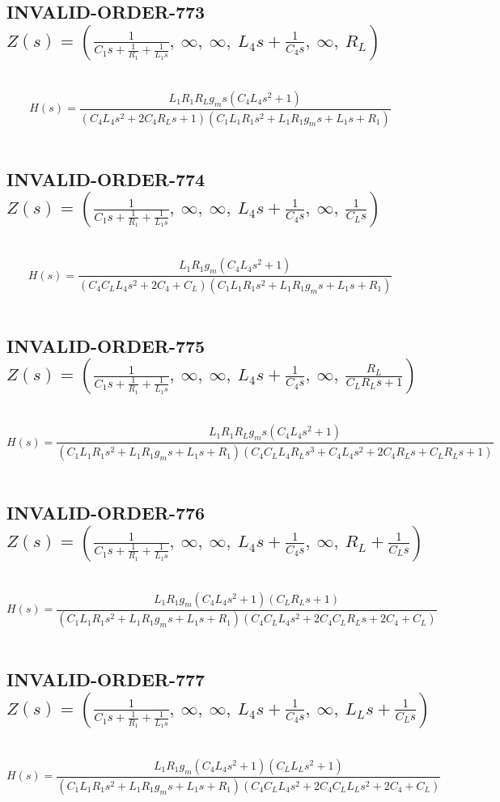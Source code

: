 \documentclass{article}
\begin{document}
\subsection{INVALID-ORDER-773 $Z(s) = \left( \frac{1}{C_{1} s + \frac{1}{R_{1}} + \frac{1}{L_{1} s}}, \  \infty, \  \infty, \  L_{4} s + \frac{1}{C_{4} s}, \  \infty, \  R_{L}\right)$ } \ 
\textbf{\[H(s) = \frac{L_{1} R_{1} R_{L} g_{m} s \left(C_{4} L_{4} s^{2} + 1\right)}{\left(C_{4} L_{4} s^{2} + 2 C_{4} R_{L} s + 1\right) \left(C_{1} L_{1} R_{1} s^{2} + L_{1} R_{1} g_{m} s + L_{1} s + R_{1}\right)}\] } \ 
\subsection{INVALID-ORDER-774 $Z(s) = \left( \frac{1}{C_{1} s + \frac{1}{R_{1}} + \frac{1}{L_{1} s}}, \  \infty, \  \infty, \  L_{4} s + \frac{1}{C_{4} s}, \  \infty, \  \frac{1}{C_{L} s}\right)$ } \ 
\textbf{\[H(s) = \frac{L_{1} R_{1} g_{m} \left(C_{4} L_{4} s^{2} + 1\right)}{\left(C_{4} C_{L} L_{4} s^{2} + 2 C_{4} + C_{L}\right) \left(C_{1} L_{1} R_{1} s^{2} + L_{1} R_{1} g_{m} s + L_{1} s + R_{1}\right)}\] } \ 
\subsection{INVALID-ORDER-775 $Z(s) = \left( \frac{1}{C_{1} s + \frac{1}{R_{1}} + \frac{1}{L_{1} s}}, \  \infty, \  \infty, \  L_{4} s + \frac{1}{C_{4} s}, \  \infty, \  \frac{R_{L}}{C_{L} R_{L} s + 1}\right)$ } \ 
\textbf{\[H(s) = \frac{L_{1} R_{1} R_{L} g_{m} s \left(C_{4} L_{4} s^{2} + 1\right)}{\left(C_{1} L_{1} R_{1} s^{2} + L_{1} R_{1} g_{m} s + L_{1} s + R_{1}\right) \left(C_{4} C_{L} L_{4} R_{L} s^{3} + C_{4} L_{4} s^{2} + 2 C_{4} R_{L} s + C_{L} R_{L} s + 1\right)}\] } \ 
\subsection{INVALID-ORDER-776 $Z(s) = \left( \frac{1}{C_{1} s + \frac{1}{R_{1}} + \frac{1}{L_{1} s}}, \  \infty, \  \infty, \  L_{4} s + \frac{1}{C_{4} s}, \  \infty, \  R_{L} + \frac{1}{C_{L} s}\right)$ } \ 
\textbf{\[H(s) = \frac{L_{1} R_{1} g_{m} \left(C_{4} L_{4} s^{2} + 1\right) \left(C_{L} R_{L} s + 1\right)}{\left(C_{1} L_{1} R_{1} s^{2} + L_{1} R_{1} g_{m} s + L_{1} s + R_{1}\right) \left(C_{4} C_{L} L_{4} s^{2} + 2 C_{4} C_{L} R_{L} s + 2 C_{4} + C_{L}\right)}\] } \ 
\subsection{INVALID-ORDER-777 $Z(s) = \left( \frac{1}{C_{1} s + \frac{1}{R_{1}} + \frac{1}{L_{1} s}}, \  \infty, \  \infty, \  L_{4} s + \frac{1}{C_{4} s}, \  \infty, \  L_{L} s + \frac{1}{C_{L} s}\right)$ } \ 
\textbf{\[H(s) = \frac{L_{1} R_{1} g_{m} \left(C_{4} L_{4} s^{2} + 1\right) \left(C_{L} L_{L} s^{2} + 1\right)}{\left(C_{1} L_{1} R_{1} s^{2} + L_{1} R_{1} g_{m} s + L_{1} s + R_{1}\right) \left(C_{4} C_{L} L_{4} s^{2} + 2 C_{4} C_{L} L_{L} s^{2} + 2 C_{4} + C_{L}\right)}\] } \ 
\end{document}
